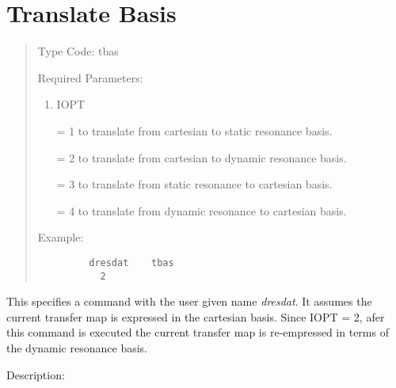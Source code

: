\newpage
\section{Translate Basis}    
\begin{quotation}
\noindent     Type Code:  tbas
\vspace{5mm}

\noindent Required Parameters:
\begin{enumerate}
      \item  IOPT

             = 1 to translate from cartesian to static resonance basis.

             = 2 to translate from cartesian to dynamic resonance basis.

             = 3 to translate from static resonance to cartesian basis.

             = 4 to translate from dynamic resonance to cartesian basis.
\end{enumerate}

\vspace{5mm}
\noindent Example:
\begin{verbatim}
         dresdat    tbas
           2
\end{verbatim}
\end{quotation}
This specifies a command with the user given name {\em dresdat}.  It
assumes the current transfer map is expressed in the cartesian basis.
Since IOPT = 2, afer this command is executed the current transfer map is
re-empressed in terms of the dynamic resonance basis.

\vspace{5mm}
     Description:
\vspace{2mm}

